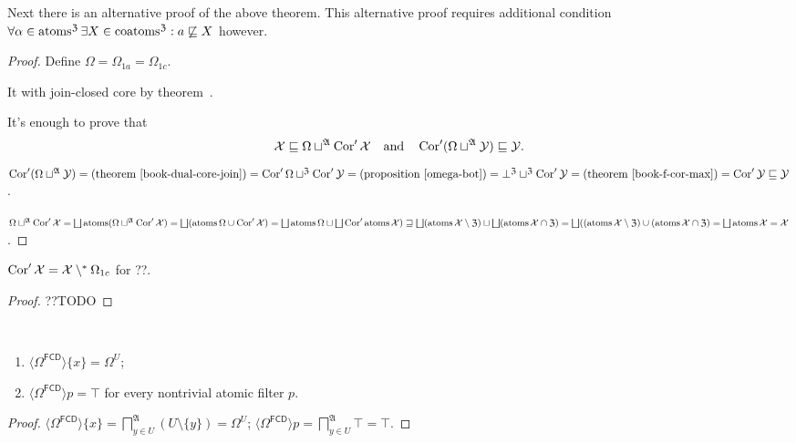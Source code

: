 Next there is an alternative proof of the above theorem.
This alternative proof requires additional condition
$\forall \alpha \in \operatorname{atoms}^{\mathfrak{Z}} \exists X \in \operatorname{coatoms}^{\mathfrak{Z}} : a
\not\sqsubseteq X$ however.

\begin{proof}
Define $\Omega = \Omega_{1a} = \Omega_{1c}$.

It with join-closed core by theorem~.

It's enough to prove that
\[
\mathcal{X}\sqsubseteq\Omega\sqcup^{\mathfrak{A}}\operatorname{Cor}'\mathcal{X}\quad\text{and}\quad\operatorname{Cor}'(\Omega\sqcup^{\mathfrak{A}}\mathcal{Y})\sqsubseteq\mathcal{Y}.
\]
$\Cor'(\Omega\sqcup^{\mathfrak{A}}\mathcal{Y}) =
\text{(theorem~\bookref{dual-core-join})} =
\Cor'\Omega\sqcup^{\mathfrak{Z}}\Cor'\mathcal{Y} =
\text{(proposition~\ref{omega-bot})} =
\bot^{\mathfrak{Z}}\sqcup^{\mathfrak{Z}}\Cor'\mathcal{Y} =
\text{(theorem~\bookref{f-cor-max})} =
\Cor'\mathcal{Y}\sqsubseteq\mathcal{Y}$.

$\Omega\sqcup^{\mathfrak{A}}\Cor'\mathcal{X} =
\bigsqcup\atoms(\Omega\sqcup^{\mathfrak{A}}\Cor'\mathcal{X}) =
\bigsqcup(\atoms\Omega\cup\Cor'\mathcal{X}) =
\bigsqcup\atoms\Omega\sqcup\bigsqcup\Cor'\atoms\mathcal{X}) \sqsupseteq
\bigsqcup(\atoms\mathcal{X}\setminus\mathfrak{Z}) \sqcup
\bigsqcup(\atoms\mathcal{X}\cap\mathfrak{Z}) =
\bigsqcup((\atoms\mathcal{X}\setminus\mathfrak{Z}) \cup
(\atoms\mathcal{X}\cap\mathfrak{Z}) =
\bigsqcup\atoms\mathcal{X} = \mathcal{X}$.
\end{proof}

\begin{prop}
$\operatorname{Cor}'\mathcal{X} = \mathcal{X}\setminus^{\ast}\Omega_{1c}$ for ??.
\end{prop}

\begin{proof}
??TODO
\end{proof}

\begin{prop}
  ~  
  \begin{enumerate}
    \item $\langle \Omega^{\mathsf{FCD}} \rangle \{ x \} = \Omega^U$;
    
    \item $\langle \Omega^{\mathsf{FCD}} \rangle p = \top$ for every
    nontrivial atomic filter $p$.
  \end{enumerate}
\end{prop}

\begin{proof}
  $\langle \Omega^{\mathsf{FCD}} \rangle \{ x \} =
  \bigsqcap^{\mathfrak{A}}_{y \in U} (U \setminus \{ y \}) = \Omega^U$;
  $\langle \Omega^{\mathsf{FCD}} \rangle p = \bigsqcap^{\mathfrak{A}}_{y
  \in U} \top = \top$.
\end{proof}

